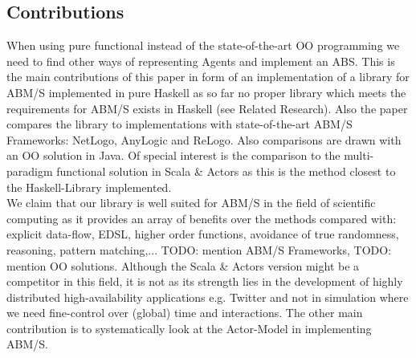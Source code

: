 \subsection{Contributions}
When using pure functional instead of the state-of-the-art OO programming we need to find other ways of representing Agents and implement an ABS. This is the main contributions of this paper in form of an implementation of a library for ABM/S implemented in pure Haskell as so far no proper library which meets the requirements for ABM/S exists in Haskell (see Related Research). Also the paper compares the library to implementations with state-of-the-art ABM/S Frameworks: NetLogo, AnyLogic and ReLogo. Also comparisons are drawn with an OO solution in Java. Of special interest is the comparison to the multi-paradigm functional solution in Scala \& Actors as this is the method closest to the Haskell-Library implemented. \\
We claim that our library is well suited for ABM/S in the field of scientific computing as it provides an array of benefits over the methods compared with: explicit data-flow, EDSL, higher order functions, avoidance of true randomness, reasoning, pattern matching,... TODO: mention ABM/S Frameworks, TODO: mention OO solutions. Although the Scala \& Actors version might be a competitor in this field, it is not as its strength lies in the development of highly distributed high-availability applications e.g. Twitter and not in simulation where we need fine-control over (global) time and interactions.
The other main contribution is to systematically look at the Actor-Model in implementing ABM/S.